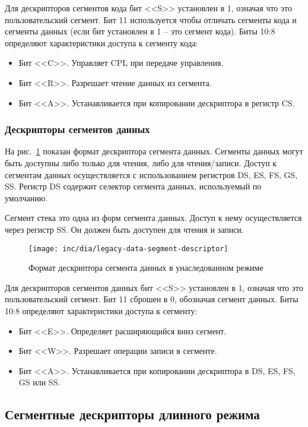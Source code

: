 Для дескрипторов сегментов кода бит <<S>> установлен в 1, означая что это пользовательский сегмент. Бит 11
используется чтобы отличать сегменты кода и сегменты данных (если бит установлен в 1 -- это сегмент кода).
Биты 10:8 определяют характеристики доступа к сегменту кода:
\begin{itemize}
	\item Бит <<C>>. Управляет CPL при передаче управления.
	\item Бит <<R>>. Разрешает чтение данных из сегмента.
	\item Бит <<A>>. Устанавливается при копировании дескриптора в регистр CS.
\end{itemize}

\subsubsection*{Дескрипторы сегментов данных}
На рис.~\ref{fig:legacy-data-segment-descriptor-format} показан формат дескриптора сегмента данных.
Сегменты данных могут быть доступны либо только для чтения, либо для чтения/записи. Доступ к сегментам
данных осуществляется с использованием регистров DS, ES, FS, GS, SS. Регистр DS содержит селектор
сегмента данных, используемый по умолчанию.

Сегмент стека это одна из форм сегмента данных. Доступ к нему осуществляется через регистр SS. Он должен
быть доступен для чтения и записи.

\begin{figure}[ht!]
  \centering
  \texttt{[image: inc/dia/legacy-data-segment-descriptor]}
  \caption{Формат дескриптора сегмента данных в унаследованном режиме}
  \label{fig:legacy-data-segment-descriptor-format}
\end{figure}

Для дескрипторов сегментов данных бит <<S>> установлен в 1, означая что это пользовательский сегмент. Бит 11
сброшен в 0, обозначая сегмент данных. Биты 10:8 определяют характеристики доступа к сегменту:
\begin{itemize}
	\item Бит <<E>>. Определяет расширяющийся вниз сегмент.
	\item Бит <<W>>. Разрешает операции записи в сегменте.
	\item Бит <<A>>. Устанавливается при копировании дескриптора в DS, ES, FS, GS или SS.
\end{itemize}

\subsection{Сегментные дескрипторы длинного режима}
